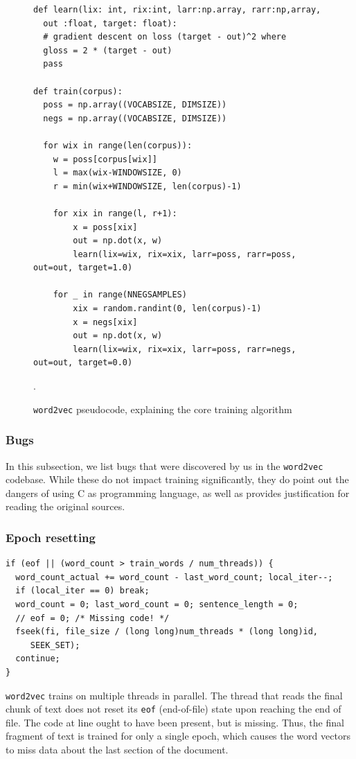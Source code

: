 \documentclass[11pt]{book}
\newcommand*\circled[1]{\tikz[baseline=(char.base)]{
            \node[shape=circle,fill=pairedOneLightBlue,inner sep=1pt] (char) {#1};}}
\begin{document}
\begin{figure}[htb]
\begin{verbatim}
def learn(lix: int, rix:int, larr:np.array, rarr:np,array,
  out :float, target: float):
  # gradient descent on loss (target - out)^2 where
  gloss = 2 * (target - out)
  pass

def train(corpus):
  poss = np.array((VOCABSIZE, DIMSIZE))
  negs = np.array((VOCABSIZE, DIMSIZE))

  for wix in range(len(corpus)):
    w = poss[corpus[wix]]
    l = max(wix-WINDOWSIZE, 0)
    r = min(wix+WINDOWSIZE, len(corpus)-1)

    for xix in range(l, r+1):
        x = poss[xix]
        out = np.dot(x, w)
        learn(lix=wix, rix=xix, larr=poss, rarr=poss, out=out, target=1.0)

    for _ in range(NNEGSAMPLES)
        xix = random.randint(0, len(corpus)-1)
        x = negs[xix]
        out = np.dot(x, w)
        learn(lix=wix, rix=xix, larr=poss, rarr=negs, out=out, target=0.0)
\end{verbatim}
\caption{\texttt{word2vec} pseudocode, explaining the core training algorithm}.
\label{fig:w2v-py-pseudocode}
\end{figure}

\subsubsection{Bugs}

In this subsection, we list bugs that were discovered by us in the \texttt{word2vec}
codebase. While these do not impact training significantly, they do point out
the dangers of using C as programming language, as well as provides justification
for reading the original sources.


\subsubsection{Epoch resetting}

\begin{verbatim}
if (eof || (word_count > train_words / num_threads)) {
  word_count_actual += word_count - last_word_count; local_iter--;
  if (local_iter == 0) break;
  word_count = 0; last_word_count = 0; sentence_length = 0;
  // eof = 0; /* Missing code! */
  fseek(fi, file_size / (long long)num_threads * (long long)id,
     SEEK_SET);
  continue;
}
\end{verbatim}

\texttt{word2vec} trains on multiple threads in parallel. The thread that reads
the final chunk of text does not reset its \texttt{eof} (end-of-file) state
upon reaching the end of file. The code at line \circled{5} ought to have been present,
but is missing. Thus, the final fragment of text is trained for only a single
epoch, which causes the word vectors to miss data about the last section of the document.
\end{document}
